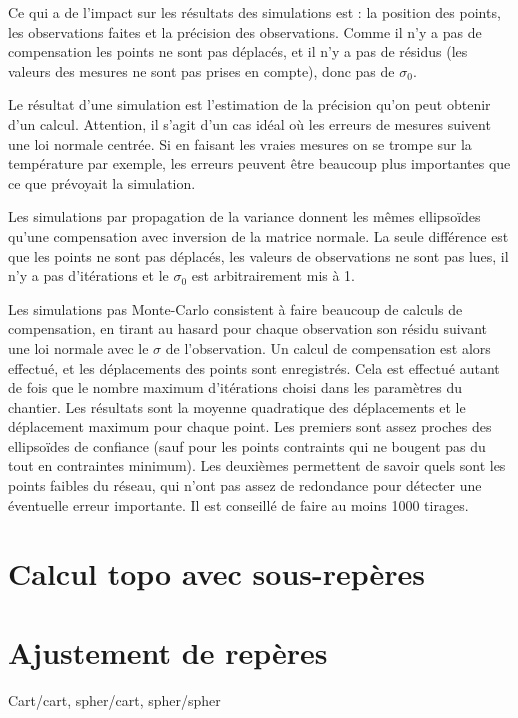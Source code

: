\documentclass[french]{report}
\begin{document}
Ce qui a de l'impact sur les résultats des simulations est : la position des points, les observations faites et la précision des observations.
Comme il n'y a pas de compensation les points ne sont pas déplacés, et il n'y a pas de résidus (les valeurs des mesures ne sont pas prises en compte),
donc pas de $\sigma_0$.

Le résultat d'une simulation est l'estimation de la précision qu'on peut obtenir d'un calcul. Attention, il s'agit d'un cas idéal où les erreurs
de mesures suivent une loi normale centrée. Si en faisant les vraies mesures on se trompe sur la température par exemple, les erreurs peuvent
être beaucoup plus importantes que ce que prévoyait la simulation.

Les simulations par propagation de la variance donnent les mêmes ellipsoïdes qu'une compensation avec inversion de la matrice normale.
La seule différence est que les points ne sont pas déplacés, les valeurs de observations ne sont pas lues, il n'y a pas d'itérations et le $\sigma_0$ est arbitrairement mis à 1.


Les simulations pas Monte-Carlo consistent à faire beaucoup de calculs de compensation,
en tirant au hasard pour chaque observation son résidu suivant une loi normale avec le $\sigma$ de l'observation. Un calcul de compensation est alors
effectué, et les déplacements des points sont enregistrés.
Cela est effectué autant de fois que le nombre maximum d'itérations choisi dans les paramètres du chantier.
Les résultats sont la moyenne quadratique des déplacements et le déplacement maximum pour chaque point.
Les premiers sont assez proches des
ellipsoïdes de confiance (sauf pour les points contraints qui ne bougent pas du tout en contraintes minimum). Les deuxièmes permettent de savoir
quels sont les points faibles du réseau, qui n'ont pas assez de redondance pour détecter une éventuelle erreur importante.
Il est conseillé de faire au moins 1000 tirages.


\section{Calcul topo avec sous-repères}
\section{Ajustement de repères}
Cart/cart, spher/cart, spher/spher
\end{document}
